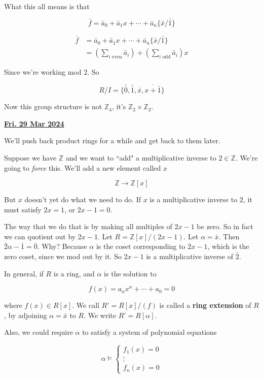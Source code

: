 \documentclass[12pt]{article}
\renewcommand{\date}[1]{\underline{\bf #1}}
\def\Z{{\mathbb Z}}
\theoremstyle{remark}
\theoremstyle{remark}
\theoremstyle{remark}
\theoremstyle{remark}
\theoremstyle{remark}
\begin{document}
{  What this all means is that

  \[
    \bar f = \bar a_0 + \bar a_1 x + \cdots + \bar a_n \{ \bar x / \bar 1 \}
  \]

  \begin{align*}
    \bar f &= \bar a_0 + \bar a_1 x + \cdots + \bar a_n \{ \bar x / \bar 1 \} \\
           &= \left(\sum_{i \text{ even}} \bar a_i\right) + \left(\sum_{i \text{ odd}} \bar a_i\right) x
  \end{align*}

  Since we're working mod $2$. So 

  \[
    R / I = \{\overline{\bar 0}, \overline{\bar 1}, \bar x, \overline{x + \bar 1}\}
  \]

  Now this group structure is not $\Z_4$, it's $\Z_2 \times \Z_2$.
}


\date{Fri. 29 Mar 2024}

We'll push back product rings for a while and get back to them later.

Suppose we have $\Z$ and we want to ``add" a multiplicative inverse to $2 \in
\Z$. We're going to {\it force} this. We'll add a new element called $x$

\[
  \Z \to \Z[x]
\]

But $x$ doesn't yet do what we need to do. If $x$ is a multiplicative inverse to
$2$, it must satisfy $2x = 1$, or $2x - 1 = 0$.

The way that we do that is by making all multiples of $2x - 1$ be zero. So in
fact we can quotient out by $2x - 1$. Let $R = \Z[x] / (2x - 1)$. Let $\alpha =
\bar x$. Then $\bar 2 \alpha - \bar 1 = \bar 0$. Why? Because $\alpha$ is the
coset corresponding to $2x - 1$, which is the zero coset, since we mod out by
it. So $2x - 1$ is a multiplicative inverse of $\bar 2$.

In general, if $R$ is a ring, and $\alpha$ is the solution to 

\[
  f(x) = a_n x^n + \cdots + a_0 = 0
\]

where $f(x) \in R[x]$. We call $R' = R[x] / (f)$ is called a {\bf ring
extension} of $R$, by adjoining $\alpha = \bar x$ to $R$. We write $R' =
R[\alpha]$.

Also, we could require $\alpha$ to satisfy a system of polynomial equations

\[
  \alpha \models \begin{cases*}
    f_1(x) = 0 \\
    \vdots \\
    f_n(x) = 0
  \end{cases*}
\]
\end{document}
